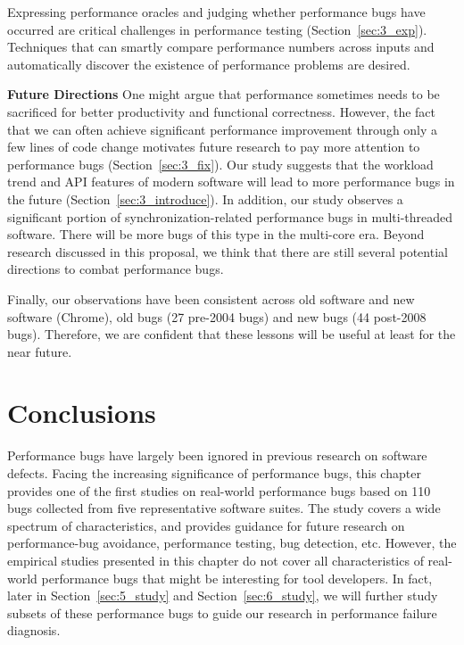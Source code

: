 Expressing performance oracles and judging whether performance bugs have 
occurred are critical challenges in performance testing 
(Section~\ref{sec:3_exp}). Techniques that can smartly compare performance
numbers across inputs and automatically discover the existence of 
performance problems are 
desired.

{\bf Future Directions}
One might argue that performance sometimes needs
to be sacrificed for better productivity and functional correctness. However,
the fact that we can often achieve significant performance improvement through
only a few lines of code change motivates future research to pay more
attention to performance bugs (Section~\ref{sec:3_fix}).
Our study suggests 
that the workload trend and API features of modern software will lead
to more performance bugs in the future (Section~\ref{sec:3_introduce}).
In addition, our study observes a significant portion of synchronization-related
performance bugs in multi-threaded software. There will be more bugs of this
type in the multi-core era. Beyond research discussed in this proposal, we think 
that there are still several potential directions to combat performance bugs.

Finally, our observations have been consistent across old software and new 
software (Chrome), old bugs (27 pre-2004 bugs) and new bugs (44 post-2008 bugs).
Therefore, we are confident that these lessons will be useful at least 
for the near
future.

\section{Conclusions}

Performance bugs have largely been ignored in previous research
on software defects. Facing the increasing significance of performance
bugs, this chapter provides one of the first studies on
real-world performance bugs based on 110 bugs collected from
five representative software suites. The study covers a wide spectrum
of characteristics, and provides guidance for future research
on performance-bug avoidance, performance testing, bug detection,
etc. 
However, the empirical studies presented in this chapter do not cover all characteristics 
of real-world performance bugs that might be interesting for tool developers. 
In fact, later in Section~\ref{sec:5_study} and Section~\ref{sec:6_study}, 
we will further study subsets of these performance bugs to guide our 
research in performance failure diagnosis.

